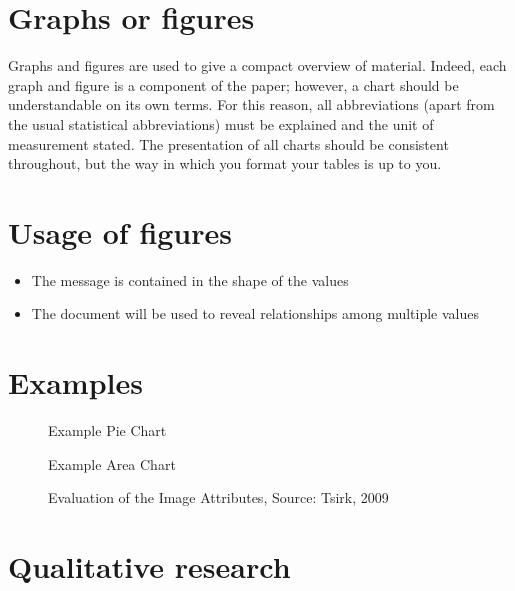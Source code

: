 \section{Graphs or figures}
\label{sec:figureexample}

Graphs and figures are used to give a compact overview of material. Indeed, each graph and figure is a component of the paper; however, a chart should be understandable on its own terms. 
For this reason, all abbreviations (apart from the usual statistical abbreviations) must be explained and the unit of measurement stated. 
The presentation of all charts should be consistent throughout, but the way in which you format your tables is up to you. 


\section{Usage of figures}
\label{sec:figures}

\begin{itemize}
\item The message is contained in the shape of the values
\item The document will be used to reveal relationships among multiple values 
\end{itemize}

 
\section{Examples}
\label{sec:figuresExamples}

\begin{figure}[!ht]
       \caption{\label{fig:piechart} Example Pie Chart}
\end{figure}

\begin{figure}[!htb]
        \caption{\label{fig:areachart} Example Area Chart}
\end{figure}

\begin{figure}[!htb]
        \caption{\label{fig:linechart} Evaluation of the Image Attributes, Source: Tsirk, 2009}
\end{figure}      

\section{Qualitative research}
\label{sec:qualitativeresearchs}

